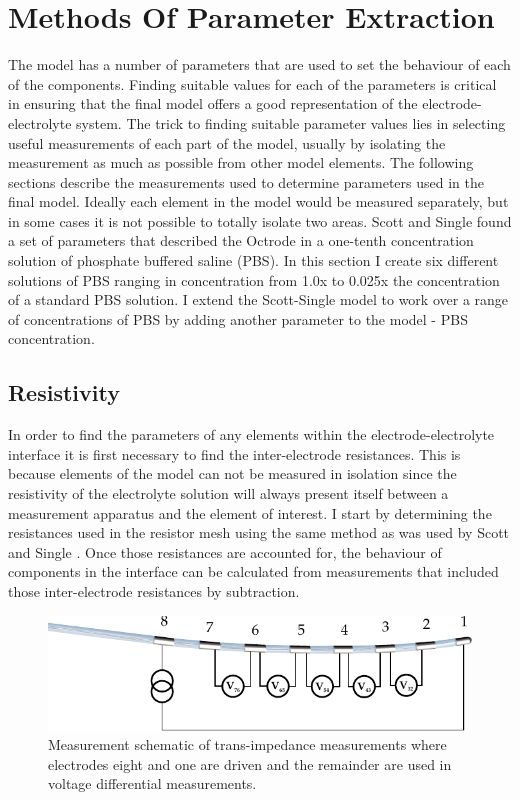 \section{Methods Of Parameter Extraction}
  The model has a number of parameters that are used to set the behaviour of each of the components.
  Finding suitable values for each of the parameters is critical in ensuring that the final model offers a good representation of the electrode-electrolyte system.
  The trick to finding suitable parameter values lies in selecting useful measurements of each part of the model, usually by isolating the measurement as much as possible from other model elements.
  The following sections describe the measurements used to determine parameters used in the final model.
  Ideally each element in the model would be measured separately, but in some cases it is not possible to totally isolate two areas.
  Scott and Single found a set of parameters that described the Octrode in a one-tenth concentration solution of phosphate buffered saline (PBS).
  In this section I create six different solutions of PBS ranging in concentration from 1.0x to 0.025x the concentration of a standard PBS solution.
  I extend the Scott-Single model to work over a range of concentrations of PBS by adding another parameter to the model - PBS concentration.


  \subsection{Resistivity}
    In order to find the parameters of any elements within the electrode-electrolyte interface it is first necessary to find the inter-electrode resistances.
    This is because elements of the model can not be measured in isolation since the resistivity of the electrolyte solution will always present itself between a measurement apparatus and the element of interest.
    I start by determining the resistances used in the resistor mesh using the same method as was used by Scott and Single \cite{Scott2014}.
    Once those resistances are accounted for, the behaviour of components in the interface can be calculated from measurements that included those inter-electrode resistances by subtraction.

    \begin{figure}
      \centering
      \includegraphics{content/pt2/07-InterfaceModel/graphics/TransimpedanceMeasurements_Stim81}
      \caption{\label{fig:pt2-transimpedanceMeasurementDiagram_81Stim}Measurement schematic of trans-impedance measurements where electrodes eight and one are driven and the remainder are used in voltage differential measurements.}
    \end{figure}

